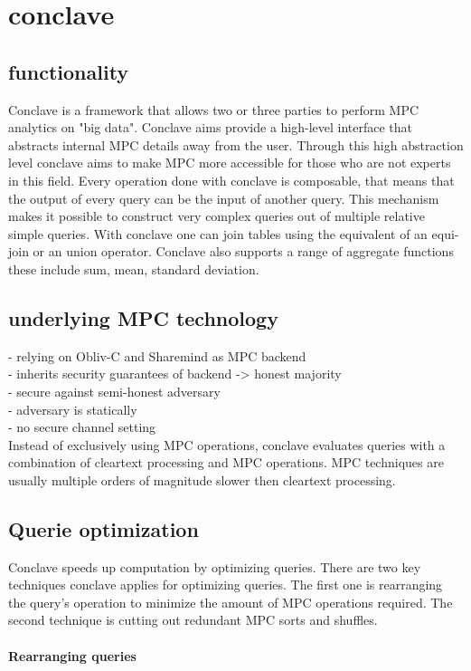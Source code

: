 \section{conclave}


\subsection{functionality}
Conclave is a framework that allows two or three parties to perform MPC analytics on "big data". Conclave aims provide a high-level interface that abstracts internal MPC details away from the user. Through this high abstraction level conclave aims to make MPC more accessible for those who are not experts in this field.  Every operation done with conclave is composable, that means that the output of every query can be the input of another query. This mechanism makes it possible to construct very complex queries out of multiple relative simple queries.  With conclave one can join tables using the equivalent of an equi-join or an union operator. Conclave also supports a range of aggregate functions these include sum, mean, standard deviation. 

\subsection{underlying MPC technology}


- relying on Obliv-C and Sharemind as MPC backend\\
- inherits security guarantees of backend -> honest majority \\
- secure against semi-honest adversary \\
- adversary is statically\\
- no secure channel setting\\

Instead of exclusively using MPC operations, conclave evaluates queries with a combination of cleartext processing and MPC operations. 
MPC techniques are usually multiple orders of magnitude slower then cleartext processing. 


\subsection{Querie optimization}
Conclave speeds up computation by optimizing queries. There are two key techniques conclave applies for optimizing queries. The first one is rearranging the query's operation to minimize the amount of MPC operations required. The second technique is cutting out redundant MPC sorts and shuffles.  \paragraph{Rearranging queries} 

